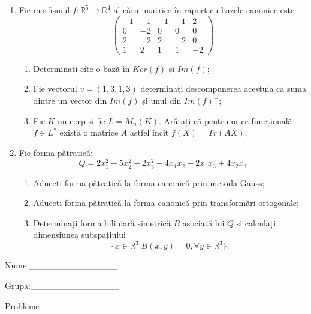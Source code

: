 \documentclass{article}
\begin{document}
\begin{enumerate}
 \item Fie morfismul $f:\mathbb{R}^5 \to \mathbb{R}^4$ al cărui matrice în raport cu bazele canonice este
$$\begin{pmatrix}
-1&-1&-1&-1&2\\
0&-2&0&0&0\\
2&-2&2&-2&0\\
1&2&1&1&-2
\end{pmatrix}$$

\begin{enumerate}
\item Determinați cîte o bază în $Ker(f)$ și $Im(f)$;
\item Fie vectorul $v=(1,3,1,3)$ determinați descompunerea acestuia ca suma dintre un vector din $Im(f)$ și unul din $Im(f)^\perp$;
\item Fie $K$ un corp și fie $L=M_n(K)$. Arătați că pentru orice funcțională $f \in L^*$ există o matrice $A$ astfel încît $f(X)=Tr(AX)$;
\end{enumerate}
\item Fie forma pătratică:
$$Q= 2x_1^2+5x_2^2+2x_3^2-4x_1x_2-2x_1x_3+4x_2x_3$$

\begin{enumerate}
\item Aduceți forma pătratică la forma canonică prin metoda Gauss;
\item Aduceți forma pătratică la forma canonică prin transformări ortogonale;
\item Determinați forma biliniară simetrică $B$ asociată lui $Q$ și calculați dimensiunea subspațiului
$$\{x \in \mathbb{R}^3 | B(x,y)=0,\forall y \in \mathbb{R}^3\}.$$

\end{enumerate}
\end{enumerate}
\newpage
\begin{flushright}
Nume:\_\_\_\_\_\_\_\_\_\_\_\_\_\_
 
 
Grupa:\_\_\_\_\_\_\_\_\_\_\_\_\_\_
\end{flushright}
\begin{center}
\vspace{2cm}
{\Large Probleme}
\vspace{2cm}
\end{center}
\end{document}
